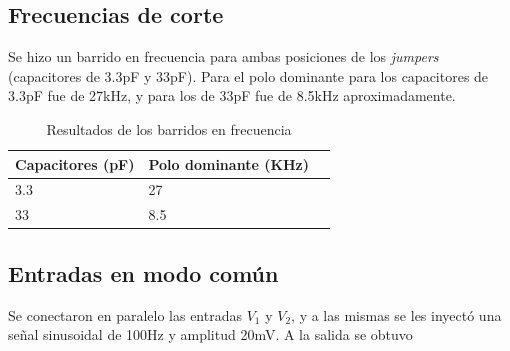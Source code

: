 \documentclass[letterpaper, 10 pt, conference]{ieeeconf}  %
\begin{document}
\subsection{Frecuencias de corte}
Se hizo un barrido en frecuencia para ambas posiciones de los \textit{jumpers} (capacitores de 3.3pF y 33pF). Para el polo dominante para los capacitores de 3.3pF fue de 27kHz, y para los de 33pF fue de 8.5kHz aproximadamente.
\begin{table}[H]
  \centering
  \begin{tabular}{|l|l|l|}
    \hline
    Capacitores (pF)  & Polo dominante (KHz)  \\ \hline
    3.3               & 27                    \\ \hline
    33                & 8.5                   \\ \hline
  \end{tabular}
  \caption{Resultados de los barridos en frecuencia}
  \label{tab:result_barr_frec}
\end{table}

\subsection{Entradas en modo común}
Se conectaron en paralelo las entradas $V_{1}$ y $V_{2}$, y a las mismas se les inyectó una señal sinusoidal de 100Hz y amplitud 20mV. A la salida se obtuvo 
\end{document}
